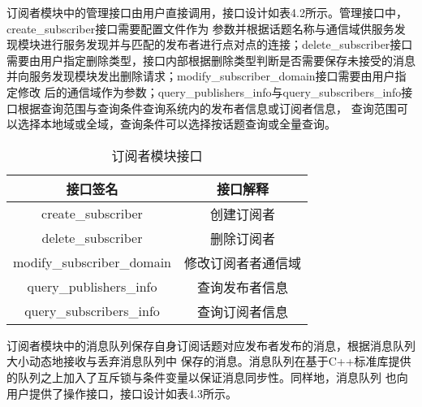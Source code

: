 订阅者模块中的管理接口由用户直接调用，接口设计如表4.2所示。管理接口中，create\_subscriber接口需要配置文件作为
参数并根据话题名称与通信域供服务发现模块进行服务发现并与匹配的发布者进行点对点的连接；delete\_subscriber接口
需要由用户指定删除类型，接口内部根据删除类型判断是否需要保存未接受的消息并向服务发现模块发出删除请求；modify\_subscriber\_domain接口需要由用户指定修改
后的通信域作为参数；query\_publishers\_info与query\_subscribers\_info接口根据查询范围与查询条件查询系统内的发布者信息或订阅者信息，
查询范围可以选择本地域或全域，查询条件可以选择按话题查询或全量查询。
\begin{table}[htb]
  \centering\small
  \caption{订阅者模块接口}
  \label{tab:exampletable}
  \begin{tabular}{cc}
    \toprule
    接口签名 & 接口解释 \\
    \midrule
    create\_subscriber & 创建订阅者\\
    delete\_subscriber & 删除订阅者\\
    modify\_subscriber\_domain & 修改订阅者者通信域\\
    query\_publishers\_info & 查询发布者信息\\
    query\_subscribers\_info & 查询订阅者信息\\
    \bottomrule
  \end{tabular}
\end{table}


订阅者模块中的消息队列保存自身订阅话题对应发布者发布的消息，根据消息队列大小动态地接收与丢弃消息队列中
保存的消息。消息队列在基于C++标准库提供的队列之上加入了互斥锁与条件变量以保证消息同步性。同样地，消息队列
也向用户提供了操作接口，接口设计如表4.3所示。

